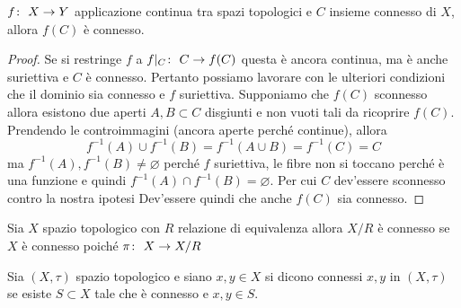 \begin{theorem}
	\label{thr:3.21.3}
	$f \colon\ X \rightarrow Y$ applicazione continua tra spazi topologici e $C$ insieme connesso di $X$, allora $f(C)$ è connesso. 
\end{theorem} 
\begin{proof}
	Se si restringe $f$ a $f|_C \colon\ C \rightarrow f(C)$ questa è ancora continua, ma è anche suriettiva e $C$ è connesso. Pertanto possiamo lavorare con le ulteriori condizioni che il dominio sia connesso e $f$ suriettiva. Supponiamo che $f(C)$ sconnesso allora esistono due aperti $A, B \subset C$ disgiunti e non vuoti tali da ricoprire $f(C)$. Prendendo le controimmagini (ancora aperte perché continue), allora 
	\begin{equation*}
		f^{-1}(A) \cup f^{-1}(B) = f^{-1}(A \cup B) = f^{-1}(C) = C
	\end{equation*}
	ma $f^{-1}(A), f^{-1}(B) \neq \varnothing$ perché $f$ suriettiva, le fibre non si toccano perché è una funzione e quindi $f^{-1}(A) \cap f^{-1}(B) = \varnothing$. Per cui $C$ dev'essere sconnesso contro la nostra ipotesi Dev'essere quindi che anche $f(C)$ sia connesso.
\end{proof}

\begin{remark}
	Sia $X$ spazio topologico con $R$ relazione di equivalenza allora $X/R$ è connesso se $X$ è connesso poiché $\pi \colon\ X \rightarrow X/R$
\end{remark} 

\begin{definition}
	Sia $(X, \tau)$ spazio topologico e siano $x, y \in X$ si dicono connessi $x, y$ in $(X, \tau)$ se esiste $S \subset X$ tale che è connesso e $x, y\in S$.
\end{definition} 

